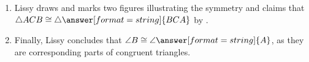 \documentclass[nooutcomes]{ximera}
\begin{document}
\begin{problem}
\begin{enumerate}
\item Lissy draws and marks two figures illustrating the symmetry and claims that  $\triangle ACB\cong \triangle\answer[format=string]{BCA}$ by . 

\item Finally, Lissy concludes that $\angle B\cong \angle\answer[format=string]{A}$, as they are corresponding parts of congruent triangles. 
\end{enumerate}

\end{problem}
\end{document}
